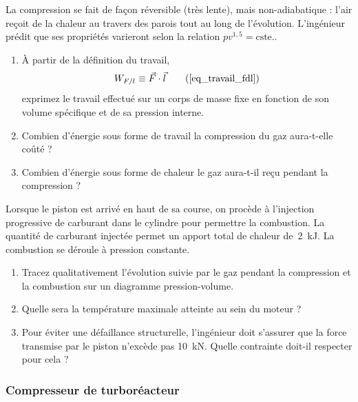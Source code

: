 	La compression se fait de façon réversible (très lente), mais non-adiabatique : l’air reçoit de la chaleur au travers des parois tout au long de l’évolution. L’ingénieur prédit que ses propriétés varieront selon la relation $p v^{1,5} = \text{cste.}$.


	\begin{enumerate}
		\item À partir de la définition du travail,
			\begin{equation}
				W_{F/l} \equiv \vec F \cdot \vec l 		\tag{\ref{eq_travail_fdl}}
			\end{equation}
			exprimez le travail effectué sur un corps de masse fixe en fonction de son volume spécifique et de sa pression interne.
		\item Combien d’énergie sous forme de travail la compression du gaz aura-t-elle coûté ?
		\item Combien d’énergie sous forme de chaleur le gaz aura-t-il reçu pendant la compression ?
	\end{enumerate}

	Lorsque le piston est arrivé en haut de sa course, on procède à l’injection progressive de carburant dans le cylindre pour permettre la combustion. La quantité de carburant injectée permet un apport total de chaleur de~\SI{2}{\kilo\joule}. La combustion se déroule à pression constante.
	
	\begin{enumerate}
		\item Tracez qualitativement l’évolution suivie par le gaz pendant la compression et la combustion sur un diagramme pression-volume.
		\item Quelle sera la température maximale atteinte au sein du moteur ?
		\item Pour éviter une défaillance structurelle, l’ingénieur doit s’assurer que la force transmise par le piston n’excède pas \SI{10}{\kilo\newton}. Quelle contrainte doit-il respecter pour cela ?
	\end{enumerate}



\subsubsection{Compresseur de turboréacteur}


